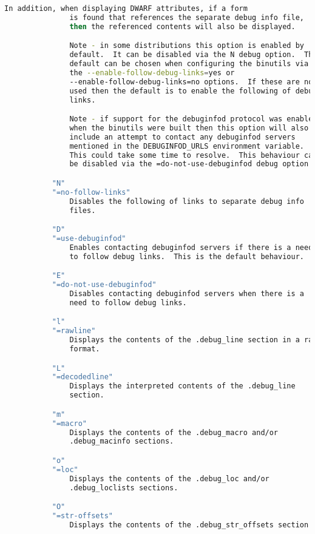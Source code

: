 {{\begin{lstlisting}[language=bash]
               In addition, when displaying DWARF attributes, if a form
               is found that references the separate debug info file,
               then the referenced contents will also be displayed.

               Note - in some distributions this option is enabled by
               default.  It can be disabled via the N debug option.  The
               default can be chosen when configuring the binutils via
               the --enable-follow-debug-links=yes or
               --enable-follow-debug-links=no options.  If these are not
               used then the default is to enable the following of debug
               links.

               Note - if support for the debuginfod protocol was enabled
               when the binutils were built then this option will also
               include an attempt to contact any debuginfod servers
               mentioned in the DEBUGINFOD_URLS environment variable.
               This could take some time to resolve.  This behaviour can
               be disabled via the =do-not-use-debuginfod debug option.

           "N"
           "=no-follow-links"
               Disables the following of links to separate debug info
               files.

           "D"
           "=use-debuginfod"
               Enables contacting debuginfod servers if there is a need
               to follow debug links.  This is the default behaviour.

           "E"
           "=do-not-use-debuginfod"
               Disables contacting debuginfod servers when there is a
               need to follow debug links.

           "l"
           "=rawline"
               Displays the contents of the .debug_line section in a raw
               format.

           "L"
           "=decodedline"
               Displays the interpreted contents of the .debug_line
               section.

           "m"
           "=macro"
               Displays the contents of the .debug_macro and/or
               .debug_macinfo sections.

           "o"
           "=loc"
               Displays the contents of the .debug_loc and/or
               .debug_loclists sections.

           "O"
           "=str-offsets"
               Displays the contents of the .debug_str_offsets section.


\end{lstlisting}}}
